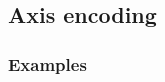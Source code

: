 
\newpage
\subsection{Axis encoding}
\label{appendix:axes}

\subsubsection{Examples}
\label{appendix:axis_samples}

